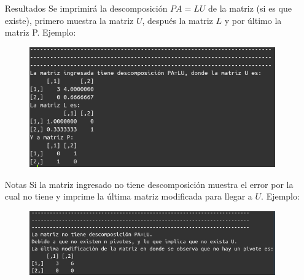 \documentclass[11pt,letterpaper]{article}
\begin{document}
\begin{enumerate}
\begin{itemize}
\item[Resultados] Se imprimirá la descomposición $PA=LU$ de la matriz (si es que existe), primero muestra la matriz $U$, después la matriz $L$ y por último la matriz P. Ejemplo:
\begin{figure}[H]
\centering
\includegraphics[scale=.7]{PA_LU_resultados.png}
\end{figure}

\item[Notas] Si la matriz ingresado no tiene descomposición muestra el error por la cual no tiene y imprime la última matriz modificada para llegar a $U$. Ejemplo:
\begin{figure}[H]
\centering
\includegraphics[scale=.7]{PA_LU_nota.png}
\end{figure}
\end{itemize}

\end{enumerate}
\end{document}
